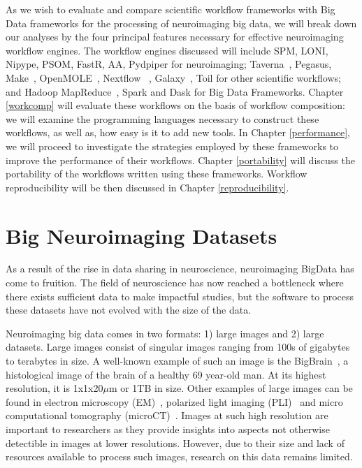 \documentclass{report}
\begin{document}
        As we wish to evaluate and compare scientific workflow frameworks with
        Big Data frameworks for the processing of neuroimaging big data, we will
        break down our analyses by the four principal features necessary for
        effective neuroimaging workflow engines. The workflow engines discussed
        will include SPM, LONI, Nipype, PSOM, FastR, AA, Pydpiper 
        for neuroimaging; Taverna~\cite{doi:10.1093/bioinformatics/bth361}, 
        Pegasus, Make~\cite{10.3389/fninf.2016.00002}, 
        OpenMOLE~\cite{passerat2014openmole}, Nextflow~\cite{Di-Tommaso:2017aa}
        , Galaxy~\cite{Goecks2010}, 
        Toil for other scientific workflows; and Hadoop 
        MapReduce~\cite{Dean:2008:MSD:1327452.1327492}, Spark and Dask for
        Big Data Frameworks. Chapter \ref{workcomp} will evaluate these 
        workflows on the basis of workflow composition: we will %
        examine the programming languages necessary to construct these workflows,
        as well as, how easy is it to add new tools. In Chapter 
        \ref{performance}, we will proceed to 
        investigate the strategies employed by these frameworks to improve the 
        performance of their workflows. Chapter \ref{portability} will discuss
        the portability of the workflows written using these frameworks. 
        Workflow reproducibility will be then discussed in Chapter 
        \ref{reproducibility}.
        

        \section{Big Neuroimaging Datasets}\label{datasets}

            As a result of the rise in data sharing in neuroscience, 
            neuroimaging
            BigData has come to fruition. The field of neuroscience has now
            reached a bottleneck where there exists sufficient data to make
            impactful studies, but the software to process these datasets have 
            not evolved with the size of the data.

            Neuroimaging big data comes in two formats: 1) large images and 2) 
            large datasets. Large images consist of singular images ranging 
            from 100s of gigabytes to terabytes in size. A well-known example 
            of 
            such an image is the BigBrain~\cite{Amunts1472}, a histological 
            image 
            of the brain of a healthy 69 year-old man. At its highest resolution,
            it is 1x1x20$\mu$m or 1TB in
            size. Other examples of large images can be found in electron 
            microscopy (EM)~\cite{Hildebrand:2017aa}, polarized light imaging 
            (PLI)~\cite{10.1007/978-3-319-12084-3_1} and micro computational
            tomography (microCT)~\cite{10.1371/journal.pone.0035691}. 
            Images at 
            such high resolution are important to researchers as they provide 
            insights into aspects not otherwise detectible in images at lower 
            resolutions. However, due to their size and lack of resources 
            available to process such images, research on this data remains 
            limited.
\end{document}
